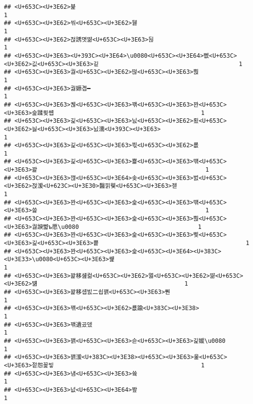 \documentclass[]{article}
\begin{document}
\begin{verbatim}
## <U+653C><U+3E62>븙                                                                  1
## <U+653C><U+3E62>씪<U+653C><U+3E62>뒗                                                            1
## <U+653C><U+3E62>젅誘몃땲<U+653C><U+3E63>뒪                                                      1
## <U+653C><U+3E63><U+393C><U+3E64>\u0080<U+653C><U+3E64>뻾<U+653C><U+3E62>깂<U+653C><U+3E63>깉                                        1
## <U+653C><U+3E63>궗<U+653C><U+3E62>떦<U+653C><U+3E63>뿭                                                      1
## <U+653C><U+3E63>궗嫄곕━                                                            1
## <U+653C><U+3E63>궪<U+653C><U+3E63>꽦<U+653C><U+3E63>꽌<U+653C><U+3E63>슱蹂묒썝                                          1
## <U+653C><U+3E63>긽<U+653C><U+3E63>닔<U+653C><U+3E62>룄<U+653C><U+3E62>늻<U+653C><U+3E63>닔濡<U+393C><U+3E63>                                    1
## <U+653C><U+3E63>긽<U+653C><U+3E63>븫<U+653C><U+3E62>룞                                                      1
## <U+653C><U+3E63>긽<U+653C><U+3E63>뾽<U+653C><U+3E63>떆<U+653C><U+3E63>꽕                                                1
## <U+653C><U+3E63>깮<U+653C><U+3E64>솢<U+653C><U+3E63>벐<U+653C><U+3E62>젅湲<U+623C><U+3E30>醫낅웾<U+653C><U+3E63>젣                              1
## <U+653C><U+3E63>꽌<U+653C><U+3E63>슱<U+653C><U+3E63>떆<U+653C><U+3E63>쓽                                                1
## <U+653C><U+3E63>꽌<U+653C><U+3E63>슱<U+653C><U+3E63>뿭<U+653C><U+3E63>궗諛뺣ъ愿\u0080                                  1
## <U+653C><U+3E63>꽌<U+653C><U+3E63>슱<U+653C><U+3E63>삦<U+653C><U+3E63>긽<U+653C><U+3E63>뿉                                          1
## <U+653C><U+3E63>꽌<U+653C><U+3E63>슱<U+653C><U+3E64><U+383C><U+3E33>\u0080<U+653C><U+3E63>썙                                        1
## <U+653C><U+3E63>꽕移섎컮<U+653C><U+3E62>엻<U+653C><U+3E62>땲<U+653C><U+3E62>떎                                          1
## <U+653C><U+3E63>꽕移섑빐二쇱꽭<U+653C><U+3E63>뿬                                                1
## <U+653C><U+3E63>꽦<U+653C><U+3E62>룞踰<U+383C><U+3E38>                                                      1
## <U+653C><U+3E63>꽦遺곴뎄                                                            1
## <U+653C><U+3E63>꽭<U+653C><U+3E63>슫<U+653C><U+3E63>긽媛\u0080                                              1
## <U+653C><U+3E63>꽭湲<U+383C><U+3E38><U+653C><U+3E63>옱<U+653C><U+3E63>젙怨꾩빟                                          1
## <U+653C><U+3E63>냼<U+653C><U+3E63>쓬                                                            1
## <U+653C><U+3E63>넚<U+653C><U+3E64>뙆                                                            1

\end{verbatim}
\end{document}
